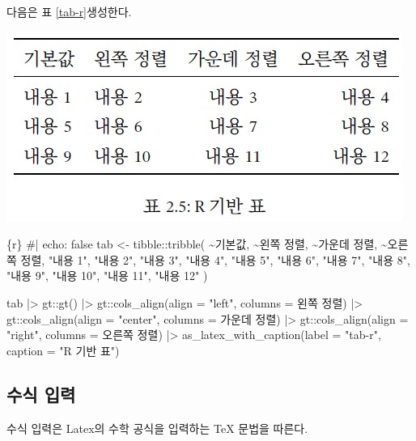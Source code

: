 \documentclass[
  letterpaper,
]{book}
\newenvironment{Shaded}{\begin{snugshade}}{\end{snugshade}}
\newcommand{\InformationTok}[1]{\textcolor[rgb]{0.37,0.37,0.37}{#1}}
\begin{document}
다음은 표 \ref{tab-r}\를 생성한다.

\includegraphics{images/table_gt.jpg}

\begin{Shaded}
\begin{Highlighting}[]
\InformationTok{\textasciigrave{}\textasciigrave{}\textasciigrave{}\{r\}}
\InformationTok{\#| echo: false}
\InformationTok{tab \textless{}{-} tibble::tribble(}
\InformationTok{  \textasciitilde{}기본값, \textasciitilde{}\textasciigrave{}왼쪽 정렬\textasciigrave{}, \textasciitilde{}\textasciigrave{}가운데 정렬\textasciigrave{}, \textasciitilde{}\textasciigrave{}오른쪽 정렬\textasciigrave{},}
\InformationTok{  "내용 1", "내용 2", "내용 3", "내용 4",}
\InformationTok{  "내용 5", "내용 6", "내용 7", "내용 8",}
\InformationTok{  "내용 9", "내용 10", "내용 11", "내용 12"}
\InformationTok{)}

\InformationTok{tab |\textgreater{} }
\InformationTok{  gt::gt() |\textgreater{} }
\InformationTok{  gt::cols\_align(align = "left", columns = \textasciigrave{}왼쪽 정렬\textasciigrave{}) |\textgreater{} }
\InformationTok{  gt::cols\_align(align = "center", columns = \textasciigrave{}가운데 정렬\textasciigrave{}) |\textgreater{} }
\InformationTok{  gt::cols\_align(align = "right", columns = \textasciigrave{}오른쪽 정렬\textasciigrave{}) |\textgreater{}}
\InformationTok{  as\_latex\_with\_caption(label = "tab{-}r", caption = "R 기반 표")}
\InformationTok{\textasciigrave{}\textasciigrave{}\textasciigrave{}}
\end{Highlighting}
\end{Shaded}

\hypertarget{uxc218uxc2dd-uxc785uxb825}{%
\subsection{수식 입력}\label{uxc218uxc2dd-uxc785uxb825}}

수식 입력은 Latex의 수학 공식을 입력하는 TeX 문법을 따른다.
\end{document}
